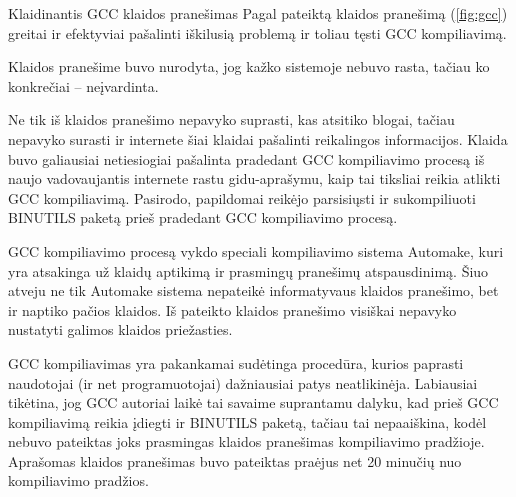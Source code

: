 \begin{xcase}{Klaidinantis GCC klaidos pranešimas}
  \xcgoal
  {
    Pagal pateiktą klaidos pranešimą (\ref{fig:gcc}) greitai ir efektyviai pašalinti iškilusią problemą ir
    toliau tęsti GCC kompiliavimą.
  }
  
  \xctools
  {
    Klaidos pranešime buvo nurodyta, jog kažko sistemoje nebuvo rasta, tačiau ko konkrečiai – 
    neįvardinta.
  }
  
  \xcresult
  {
    Ne tik iš klaidos pranešimo nepavyko suprasti, kas atsitiko blogai, tačiau nepavyko 
    surasti ir internete šiai klaidai pašalinti reikalingos informacijos.
    Klaida buvo galiausiai netiesiogiai pašalinta pradedant GCC kompiliavimo procesą iš naujo
    vadovaujantis internete rastu gidu-aprašymu, kaip tai tiksliai reikia atlikti GCC kompiliavimą. 
    Pasirodo, papildomai reikėjo parsisiųsti ir sukompiliuoti BINUTILS paketą prieš pradedant GCC 
    kompiliavimo procesą.
  }
  
  \xcprinciples
  {
    {
      GCC kompiliavimo procesą vykdo speciali kompiliavimo sistema Automake, kuri yra atsakinga
      už klaidų aptikimą ir prasmingų pranešimų atspausdinimą. Šiuo atveju ne tik Automake 
      sistema nepateikė informatyvaus klaidos pranešimo, bet ir naptiko pačios klaidos.
    }
    {
      Iš pateikto klaidos pranešimo visiškai nepavyko nustatyti galimos klaidos priežasties.
    }
  }
  
  \xcthoughts
  {
    GCC kompiliavimas yra pakankamai sudėtinga procedūra, kurios
    paprasti naudotojai (ir net programuotojai) dažniausiai patys
    neatlikinėja. Labiausiai tikėtina, jog GCC autoriai laikė tai
    savaime suprantamu dalyku, kad prieš GCC kompiliavimą reikia
    įdiegti ir BINUTILS paketą, tačiau tai nepaaiškina, kodėl
    nebuvo pateiktas joks prasmingas klaidos pranešimas kompiliavimo
    pradžioje. Aprašomas klaidos pranešimas buvo pateiktas praėjus
    net 20 minučių nuo kompiliavimo pradžios.
  }
\end{xcase}
